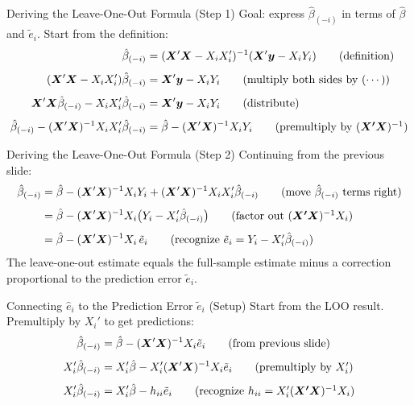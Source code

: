 \documentclass[aspectratio=169, handout, t]{beamer}
\numberwithin{equation}{section}
\begin{document}
\begin{frame}{Deriving the Leave-One-Out Formula (Step 1)}
Goal: express $\hat{\beta}_{(-i)}$ in terms of $\hat{\beta}$ and $\tilde{e}_i$. Start from the definition:
\begin{align*}
\hat{\beta}_{(-i)}&=(\bm{X}'\bm{X}-X_iX_i')^{-1}(\bm{X}'\bm{y}-X_iY_i) \tag{definition}\\[4pt]
(\bm{X}'\bm{X}-X_iX_i')\hat{\beta}_{(-i)}&=\bm{X}'\bm{y}-X_iY_i \tag{multiply both sides by $(\cdots)$}\\[4pt]
\bm{X}'\bm{X}\hat{\beta}_{(-i)}-X_iX_i'\hat{\beta}_{(-i)}&=\bm{X}'\bm{y}-X_iY_i \tag{distribute}\\[4pt]
\hat{\beta}_{(-i)}-(\bm{X}'\bm{X})^{-1}X_iX_i'\hat{\beta}_{(-i)}&=\hat{\beta}-(\bm{X}'\bm{X})^{-1}X_iY_i \tag{premultiply by $(\bm{X'X})^{-1}$}
\end{align*}
\end{frame}

\begin{frame}{Deriving the Leave-One-Out Formula (Step 2)}
Continuing from the previous slide:
\begin{align*}
\hat{\beta}_{(-i)}&=\hat{\beta}-(\bm{X}'\bm{X})^{-1}X_iY_i+(\bm{X}'\bm{X})^{-1}X_iX_i'\hat{\beta}_{(-i)} \tag{move $\hat{\beta}_{(-i)}$ terms right}\\[4pt]
&=\hat{\beta}-(\bm{X}'\bm{X})^{-1}X_i\bigl(Y_i-X_i'\hat{\beta}_{(-i)}\bigr) \tag{factor out $(\bm{X'X})^{-1}X_i$}\\[4pt]
&=\hat{\beta}-(\bm{X}'\bm{X})^{-1}X_i\,\tilde{e}_i \tag{recognize $\tilde{e}_i=Y_i-X_i'\hat{\beta}_{(-i)}$}
\end{align*}
\vspace{0.5em}
The leave-one-out estimate equals the full-sample estimate minus a correction proportional to the prediction error $\tilde{e}_i$.
\end{frame}

\begin{frame}{Connecting $\hat{e}_i$ to the Prediction Error $\tilde{e}_i$ (Setup)}
Start from the LOO result. Premultiply by $X_i'$ to get predictions:
\begin{align*}
\hat{\beta}_{(-i)}&=\hat{\beta}-(\bm{X}'\bm{X})^{-1}X_i\tilde{e}_i \tag{from previous slide}\\[4pt]
X_i'\hat{\beta}_{(-i)}&=X_i'\hat{\beta}-X_i'(\bm{X}'\bm{X})^{-1}X_i\tilde{e}_i \tag{premultiply by $X_i'$}\\[4pt]
X_i'\hat{\beta}_{(-i)}&=X_i'\hat{\beta}-h_{ii}\tilde{e}_i \tag{recognize $h_{ii}=X_i'(\bm{X'X})^{-1}X_i$}
\end{align*}
\end{frame}
\end{document}
